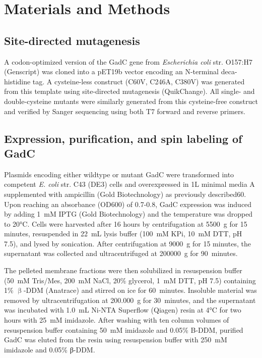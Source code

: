 \section{Materials and Methods}\label{sec:gadc_methods}

\subsection{Site-directed mutagenesis}

A codon-optimized version of the GadC gene from \emph{Escherichia coli} str. O157:H7 (Genscript) was cloned into a pET19b vector encoding an N-terminal deca-histidine tag. A cysteine-less construct (C60V, C246A, C380V) was generated from this template using site-directed mutagenesis (QuikChange). All single- and double-cysteine mutants were similarly generated from this cysteine-free construct and verified by Sanger sequencing using both T7 forward and reverse primers.

\subsection{Expression, purification, and spin labeling of GadC}

Plasmids encoding either wildtype or mutant GadC were transformed into competent \emph{E. coli} str. C43 (DE3) cells and overexpressed in 1L minimal media A supplemented with ampicillin (Gold Biotechnology) as previously described60. Upon reaching an absorbance (OD600) of 0.7-0.8, GadC expression was induced by adding \SI{1}{mM} IPTG (Gold Biotechnology) and the temperature was dropped to 20°C. Cells were harvested after 16 hours by centrifugation at \SI{5500}{g} for 15 minutes, resuspended in \SI{22}{mL} lysis buffer (\SI{100}{mM} KPi, \SI{10}{mM} DTT, pH 7.5), and lysed by sonication. After centrifugation at \SI{9000}{g} for 15 minutes, the supernatant was collected and ultracentrifuged at \SI{200000}{g} for \SI{90}{minutes}.

The pelleted membrane fractions were then solubilized in resuspension buffer (\SI{50}{mM} Tris/Mes, \SI{200}{mM} NaCl, 20\% glycerol, \SI{1}{mM} DTT, pH 7.5) containing 1\% $\mathrm{\upbeta}$-DDM (Anatrace) and stirred on ice for \SI{60}{minutes}. Insoluble material was removed by ultracentrifugation at \SI{200,000}{g} for \SI{30}{minutes}, and the supernatant was incubated with \SI{1.0}{mL} Ni-NTA Superflow (Qiagen) resin at 4°C for two hours with \SI{25}{mM} imidazole. After washing with ten column volumes of resuspension buffer containing \SI{50}{mM} imidazole and 0.05\% B-DDM, purified GadC was eluted from the resin using resuspension buffer with \SI{250}{mM} imidazole and 0.05\% β-DDM.

